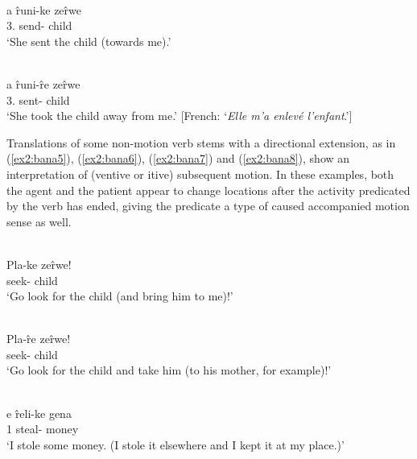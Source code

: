 \ea\label{ex2:bana3}
 \\
\gll a r̂uni-ke zer̂we	\\
3. send- child \\
\glt `She sent the child (towards me).' 

\ex\label{ex2:bana4}
 \\
\gll a r̂uni-r̂e zer̂we	\\
3. sent- child	\\
\glt `She took the child away from me.' [French: `\textit{Elle m'a enlevé l'enfant}.']
\z 

Translations of some non-motion verb stems with a directional extension, as in (\ref{ex2:bana5}), (\ref{ex2:bana6}), (\ref{ex2:bana7}) and (\ref{ex2:bana8}), show an interpretation of (ventive or itive) subsequent motion. In these examples, both the agent and the patient appear to change locations after the activity predicated by the verb has ended, giving the predicate a type of caused accompanied motion sense as well. 

\ea\label{ex2:bana5}
 \\
\gll Pla-ke zer̂we!	\\
seek- child \\
\glt `Go look for the child (and bring him to me)!' 

\ex\label{ex2:bana6}
 \\
\gll Pla-r̂e zer̂we! \\
seek- child \\
\glt `Go look for the child and take him (to his mother, for example)!' 

\ex\label{ex2:bana7}
 \\
\gll e r̂eli-ke gena \\
1 steal- money \\
\glt `I stole some money. (I stole it elsewhere and I kept it at my place.)' 

